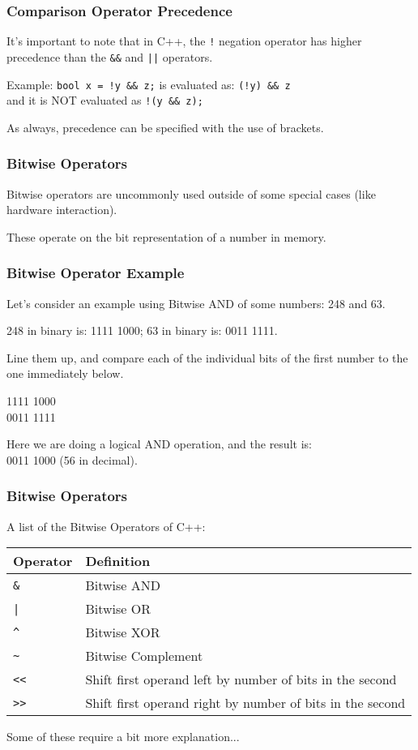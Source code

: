 \begin{frame}
\frametitle{Comparison Operator Precedence}

It's important to note that in C++, the \texttt{!} negation operator has higher precedence than the \texttt{\&\&} and \texttt{||} operators.

Example:
\texttt{bool x = !y \&\& z;} is evaluated as:
\texttt{(!y) \&\& z}\\
\quad and it is NOT evaluated as \texttt{!(y \&\& z);}

As always, precedence can be specified with the use of brackets.

\end{frame}


\begin{frame}
\frametitle{Bitwise Operators}

Bitwise operators are uncommonly used outside of some special cases (like hardware interaction).

These operate on the bit representation of a number in memory.

\end{frame}

\begin{frame}
\frametitle{Bitwise Operator Example}

Let's consider an example using Bitwise AND of some numbers: 248 and 63.

248 in binary is: 1111 1000;  63 in binary is: 0011 1111.

Line them up, and compare each of the individual bits of the first number to the one immediately below.

1111 1000\\
0011 1111

Here we are doing a logical AND operation, and the result is:\\
0011 1000 (56 in decimal).


\end{frame}

\begin{frame}
\frametitle{Bitwise Operators}

A list of the Bitwise Operators of C++:

\begin{center}
\begin{tabular}{l|l}
\textbf{Operator} & \textbf{Definition} \\ \hline
	\texttt{\&} & Bitwise AND\\ \hline
	\texttt{|} & Bitwise OR\\ \hline
	\texttt{\^} & Bitwise XOR\\ \hline
	\texttt{\~} & Bitwise Complement \\ \hline
	\texttt{\textless\textless} & Shift first operand left by number of bits in the second\\ \hline
	\texttt{\textgreater\textgreater} & Shift first operand right by number of bits in the second\\ 
\end{tabular}
\end{center}

Some of these require a bit more explanation...

\end{frame}

